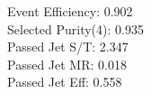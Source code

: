 Event Efficiency:   0.902\\ 
Selected Purity(4): 0.935\\ 
Passed Jet S/T:     2.347\\ 
Passed Jet MR:      0.018\\ 
Passed Jet Eff:     0.558